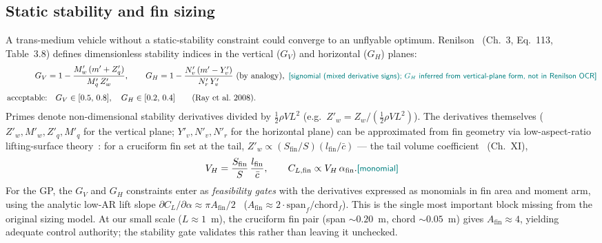 \documentclass[conf]{new-aiaa}
\newcommand{\gpc}[1]{\textcolor{teal}{\small\textsf{[#1]}}} %
\begin{document}
\subsection{Static stability and fin sizing}\label{sec:stability}
A trans-medium vehicle without a static-stability constraint could converge to an unflyable optimum.
Renilson~\cite{renilson2018submarine,fossen2011handbook} (Ch.~3, Eq.~113, Table~3.8) defines dimensionless stability
indices in the vertical ($G_V$) and horizontal ($G_H$) planes:
\begin{align}
G_V &= 1 - \frac{M'_w\,(m' + Z'_q)}{M'_q\,Z'_w},
\qquad
G_H = 1 - \frac{N'_v\,(m' - Y'_v)}{N'_r\,Y'_v}\ \text{(by analogy)},\ \gpc{signomial (mixed derivative signs); $G_H$ inferred from vertical-plane form, not in Renilson OCR}\\[4pt]
\text{acceptable:}&\quad G_V\in[0.5,\,0.8],\quad G_H\in[0.2,\,0.4] \qquad\text{(Ray~et~al.~2008)}.
\end{align}
Primes denote non-dimensional stability derivatives divided by $\frac12\rho V L^2$ (e.g.\
$Z'_w = Z_w/(\frac12\rho V L^2)$). The derivatives themselves ($Z'_w, M'_w, Z'_q, M'_q$ for the
vertical plane; $Y'_v, N'_v, N'_r$ for the horizontal plane) can be approximated from fin geometry
via low-aspect-ratio lifting-surface theory~\cite{hoerner1985fluid}: for a cruciform fin set at the
tail, $Z'_w \propto (S_{\text{fin}}/S)(l_{\text{fin}}/\bar{c})$ — the tail volume
coefficient~\cite{hoerner1985fluid} (Ch.~XI),
\begin{equation}
V_H = \frac{S_{\text{fin}}}{S}\,\frac{l_{\text{fin}}}{\bar{c}},
\qquad
C_{L,\text{fin}} \propto V_H\,\alpha_{\text{fin}}. \gpc{monomial}
\end{equation}
For the GP, the $G_V$ and $G_H$ constraints enter as \emph{feasibility gates} with the derivatives
expressed as monomials in fin area and moment arm, using the analytic low-AR lift slope
$\partial C_L/\partial\alpha \approx \pi A_{\text{fin}}/2$~\cite{hoerner1985fluid} ($A_{\text{fin}}
\approx 2\cdot\text{span}_f/\text{chord}_f$). This is the single most important block missing from
the original sizing model. At our small scale ($L\approx1$~m), the cruciform fin pair
(span $\sim\!0.20$~m, chord $\sim\!0.05$~m) gives $A_{\text{fin}}\approx4$, yielding adequate
control authority; the stability gate validates this rather than leaving it unchecked.
\end{document}
